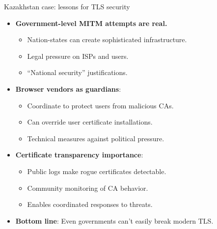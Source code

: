 \ifdefined\PRESENTATION\else\PassOptionsToClass{handout}{beamer}\fi\documentclass[aspectratio=169, lualatex]{beamer}
\begin{document}
\begin{frame}{Kazakhstan case: lessons for TLS security}
	\begin{itemize}[<+->]
		\item \textbf{Government-level MITM attempts are real.}
		      \begin{itemize}
			      \item Nation-states can create sophisticated infrastructure.
			      \item Legal pressure on ISPs and users.
			      \item ``National security'' justifications.
		      \end{itemize}
		\item \textbf{Browser vendors as guardians}:
		      \begin{itemize}
			      \item Coordinate to protect users from malicious CAs.
			      \item Can override user certificate installations.
			      \item Technical measures against political pressure.
		      \end{itemize}
		\item \textbf{Certificate transparency importance}:
		      \begin{itemize}
			      \item Public logs make rogue certificates detectable.
			      \item Community monitoring of CA behavior.
			      \item Enables coordinated responses to threats.
		      \end{itemize}
		\item \textbf{Bottom line}: Even governments can't easily break modern TLS.
	\end{itemize}
\end{frame}
\end{document}
